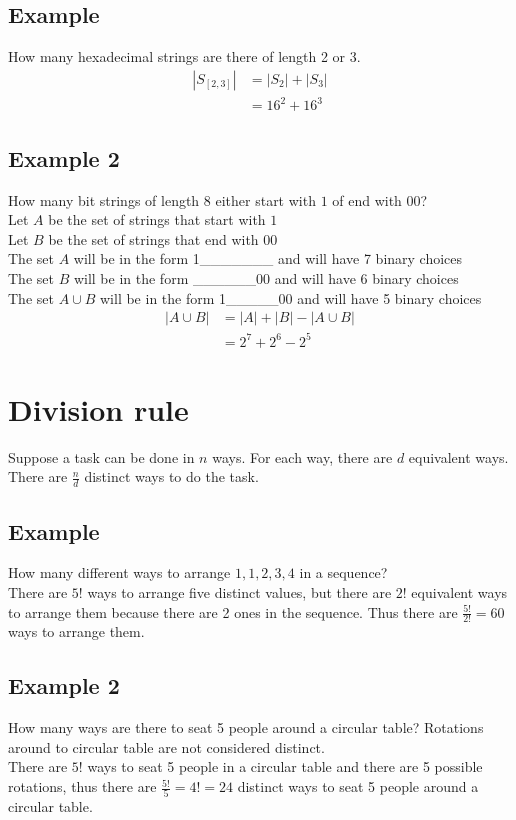 \documentclass{article}
\theoremstyle{mytheoremstyle}
\theoremstyle{mytheoremstyle}
\theoremstyle{myproblemstyle}
\begin{document}
    \subsection*{Example}
    How many hexadecimal strings are there of length 2 or 3.
    \begin{align*}
        |S_{[2,3]}| &= |S_2| + |S_3| \\
                    &= 16^2 + 16^3
    \end{align*}

    \subsection*{Example 2}
    How many bit strings of length 8 either start with $1$ of end with $00$? \\
    Let $A$ be the set of strings that start with $1$ \\
    Let $B$ be the set of  strings that end with $00$ \\
    The set $A$ will be in the form 1\_\_\_\_\_\_\_ and will have 7 binary choices \\
    The set $B$ will be in the form \_\_\_\_\_\_00 and will have 6 binary choices \\
    The set $A\cup B$ will be in the form 1\_\_\_\_\_00 and will have 5 binary choices
    \begin{align*}
        |A\cup B| &= |A| + |B| - |A \cup B| \\
                  &= 2^7 + 2^6 - 2^5
    \end{align*}

    \section*{Division rule}
    Suppose a task can be done in $n$ ways. For each way, there are $d$
    equivalent ways. There are $\frac{n}{d}$ distinct ways to do the task.

    \subsection*{Example}
    How many different ways to arrange $1,1,2,3,4$ in a sequence? \\
    There are $5!$ ways to arrange five distinct values, but there are $2!$
    equivalent ways to arrange them because there are 2 ones in the sequence.
    Thus there are $\frac{5!}{2!}=60$ ways to arrange them.

    \subsection*{Example 2}
    How many ways are there to seat 5 people around a circular table? Rotations
    around to circular table are not considered distinct. \\
    There are $5!$ ways to seat 5 people in a circular table and there are 5
    possible rotations, thus there are $\frac{5!}{5}=4!=24$ distinct ways to seat 5
    people around a circular table.
\end{document}

